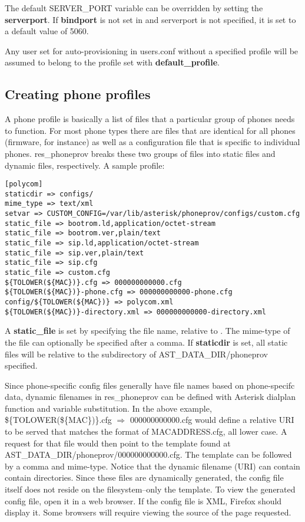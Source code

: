 The default SERVER\_PORT variable can be overridden by setting the \textbf{serverport}.
If \textbf{bindport} is not set in  and serverport is not specified, it 
is set to a default value of 5060.

Any user set for auto-provisioning in users.conf without a specified profile will be 
assumed to belong to the profile set with \textbf{default\_profile}.

\subsection{Creating phone profiles}

A phone profile is basically a list of files that a particular group of phones needs to 
function.  For most phone types there are files that are identical for all phones 
(firmware, for instance) as well as a configuration file that is specific to individual 
phones.  res\_phoneprov breaks these two groups of files into static files and dynamic 
files, respectively. A sample profile:

\begin{astlisting}
\begin{verbatim}
[polycom]
staticdir => configs/
mime_type => text/xml
setvar => CUSTOM_CONFIG=/var/lib/asterisk/phoneprov/configs/custom.cfg
static_file => bootrom.ld,application/octet-stream
static_file => bootrom.ver,plain/text
static_file => sip.ld,application/octet-stream
static_file => sip.ver,plain/text
static_file => sip.cfg
static_file => custom.cfg
${TOLOWER(${MAC})}.cfg => 000000000000.cfg
${TOLOWER(${MAC})}-phone.cfg => 000000000000-phone.cfg
config/${TOLOWER(${MAC})} => polycom.xml
${TOLOWER(${MAC})}-directory.xml => 000000000000-directory.xml
\end{verbatim}
\end{astlisting}

A \textbf{static\_file} is set by specifying the file name, relative to 
.  The mime-type of the file can optionally be specified 
after a comma.  If \textbf{staticdir} is set, all static files will be relative to the 
subdirectory of AST\_DATA\_DIR/phoneprov specified.

Since phone-specific config files generally have file names based on phone-specifc data, 
dynamic filenames in res\_phoneprov can be defined with Asterisk dialplan function and 
variable substitution. In the above example, \$\{TOLOWER(\$\{MAC\})\}.cfg $\Rightarrow$ 
000000000000.cfg would define a relative URI to be served that matches the format of 
MACADDRESS.cfg, all lower case. A request for that file would then point to the template 
found at AST\_DATA\_DIR/phoneprov/000000000000.cfg. The template can be followed by a 
comma and mime-type. Notice that the dynamic filename (URI) can contain contain 
directories. Since these files are dynamically generated, the config file itself does not 
reside on the filesystem--only the template. To view the generated config file, open it 
in a web browser. If the config file is XML, Firefox should display it. Some browsers 
will require viewing the source of the page requested.

